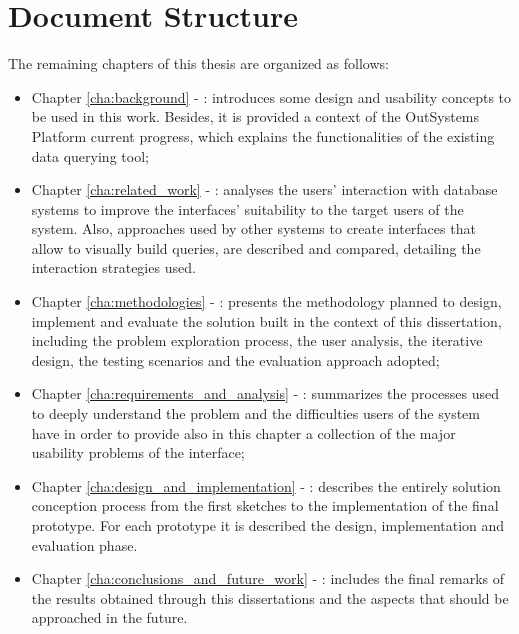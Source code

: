 \section{Document Structure}
\label{sec:document_structure}

The remaining chapters of this thesis are organized as follows:

\begin{itemize}
  \item Chapter \ref{cha:background} - : introduces some design and usability concepts to be used in this work. Besides, it is provided a context of the OutSystems Platform current progress, which explains the functionalities of the existing data querying tool;
  \item Chapter \ref{cha:related_work} - : analyses the users' interaction with database systems to improve the interfaces' suitability to the target users of the system. Also, approaches used by other systems to create interfaces that allow to visually build queries, are described and compared, detailing the interaction strategies used.
  \item Chapter \ref{cha:methodologies} - : presents the methodology planned to design, implement and evaluate the solution built in the context of this dissertation, including the problem exploration process, the user analysis, the iterative design, the testing scenarios and the evaluation approach adopted;
  \item Chapter \ref{cha:requirements_and_analysis} - : summarizes the processes used to deeply understand the problem and the difficulties users of the system have in order to provide also in this chapter a collection of the major usability problems of the interface;
  \item Chapter \ref{cha:design_and_implementation} - : describes the entirely solution conception process from the first sketches to the implementation of the final prototype. For each prototype it is described the design, implementation and evaluation phase.
  \item Chapter \ref{cha:conclusions_and_future_work} - : includes the final remarks of the results obtained through this dissertations and the aspects that should be approached in the future.
\end{itemize}
